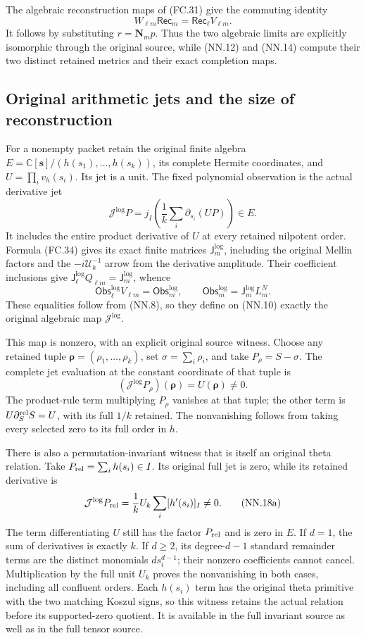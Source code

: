 The algebraic reconstruction maps of (FC.31) give the commuting identity
\[
 W_{\ell m}\mathsf{Rec}_m
       =\mathsf{Rec}_\ell V_{\ell m}.
 \tag{NN.15}
\]
It follows by substituting \(r=\boldsymbol N_m p\). Thus the two
algebraic limits are explicitly isomorphic through the original source,
while (NN.12) and (NN.14) compute their two distinct retained metrics
and their exact completion maps.

\subsection{Original arithmetic jets and the size of reconstruction}

For a nonempty packet retain the original finite algebra
\(E=\mathbb C[\mathbf s]/(h(s_1),\ldots,h(s_k))\), its complete
Hermite coordinates, and \(U=\prod_i v_h(s_i)\). Its jet is a unit.
The fixed polynomial observation is the actual derivative jet
\[
 \mathcal J^{\log}P
    =j_I\left(\frac1k\sum_i\partial_{s_i}(UP)\right)\in E.
 \tag{NN.16}
\]
It includes the entire product derivative of \(U\) at every retained
nilpotent order. Formula (FC.34) gives its exact finite matrices
\(\mathsf J_m^{\log}\), including the original Mellin factors and
the \(-i\mathscr U_k^{-1}\) arrow from the derivative amplitude.
Their coefficient inclusions give
\(\mathsf J_\ell^{\log}Q_{\ell m}=\mathsf J_m^{\log}\), whence
\[
 \mathsf{Obs}_\ell^{\log}V_{\ell m}
       =\mathsf{Obs}_m^{\log},\qquad
 \mathsf{Obs}_m^{\log}=\mathsf J_m^{\log}L_m^N.
 \tag{NN.17}
\]
These equalities follow from (NN.8), so they define on (NN.10) exactly
the original algebraic map \(\mathcal J^{\log}\).

This map is nonzero, with an explicit original source witness. Choose
any retained tuple \(\boldsymbol\rho=(\rho_1,\ldots,\rho_k)\), set
\(\sigma=\sum_i\rho_i\), and take \(P_\rho=S-\sigma\).
The complete jet evaluation at the constant coordinate of that tuple is
\[
 (\mathcal J^{\log}P_\rho)(\boldsymbol\rho)
       =U(\boldsymbol\rho)\ne0.
 \tag{NN.18}
\]
The product-rule term multiplying \(P_\rho\) vanishes at that tuple;
the other term is \(U\partial_S^{\rm rel}S=U\), with its full
\(1/k\) retained. The nonvanishing follows from taking every selected
zero to its full order in \(h\).

There is also a permutation-invariant witness that is itself an
original theta relation. Take \(P_{\rm rel}=\sum_i h(s_i)\in I\).
Its original full jet is zero, while its retained derivative is
\[
 \mathcal J^{\log}P_{\rm rel}
       =\frac1k U_k\sum_i[h'(s_i)]_I\ne0.
 \tag{NN.18a}
\]
The term differentiating \(U\) still has the factor \(P_{\rm rel}\)
and is zero in \(E\). If \(d=1\), the sum of derivatives is exactly
\(k\). If \(d\ge2\), its degree-\(d-1\) standard remainder terms
are the distinct monomials \(d s_i^{d-1}\); their nonzero coefficients
cannot cancel. Multiplication by the full unit \(U_k\) proves the
nonvanishing in both cases, including all confluent orders. Each
\(h(s_i)\) term has the original theta primitive with the two matching
Koszul signs, so this witness retains the actual relation before its
supported-zero quotient. It is available in the full invariant source
as well as in the full tensor source.

